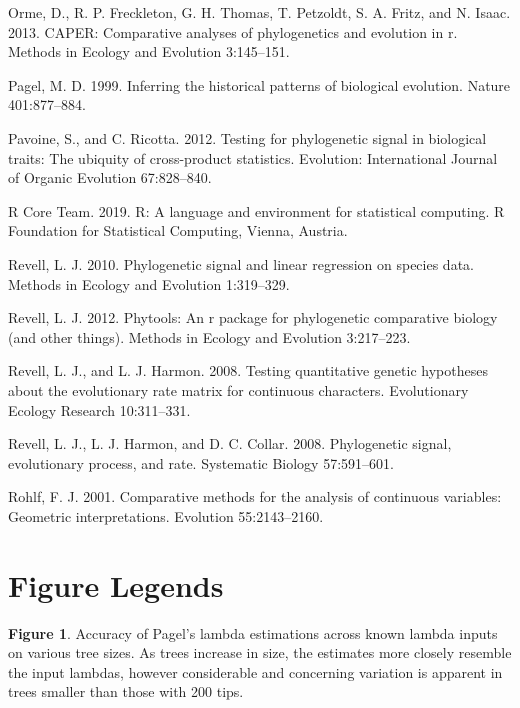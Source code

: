 \documentclass[
]{article}
\begin{document}
\leavevmode\hypertarget{ref-Orme2013}{}%
Orme, D., R. P. Freckleton, G. H. Thomas, T. Petzoldt, S. A. Fritz, and
N. Isaac. 2013. CAPER: Comparative analyses of phylogenetics and
evolution in r. Methods in Ecology and Evolution 3:145--151.

\leavevmode\hypertarget{ref-Pagel1999}{}%
Pagel, M. D. 1999. Inferring the historical patterns of biological
evolution. Nature 401:877--884.

\leavevmode\hypertarget{ref-Pavoine2012}{}%
Pavoine, S., and C. Ricotta. 2012. Testing for phylogenetic signal in
biological traits: The ubiquity of cross-product statistics. Evolution:
International Journal of Organic Evolution 67:828--840.

\leavevmode\hypertarget{ref-RCT}{}%
R Core Team. 2019. R: A language and environment for statistical
computing. R Foundation for Statistical Computing, Vienna, Austria.

\leavevmode\hypertarget{ref-Revell2010}{}%
Revell, L. J. 2010. Phylogenetic signal and linear regression on species
data. Methods in Ecology and Evolution 1:319--329.

\leavevmode\hypertarget{ref-Revell2012}{}%
Revell, L. J. 2012. Phytools: An r package for phylogenetic comparative
biology (and other things). Methods in Ecology and Evolution 3:217--223.

\leavevmode\hypertarget{ref-RevellHarmon2008}{}%
Revell, L. J., and L. J. Harmon. 2008. Testing quantitative genetic
hypotheses about the evolutionary rate matrix for continuous characters.
Evolutionary Ecology Research 10:311--331.

\leavevmode\hypertarget{ref-Revell_et_al2008}{}%
Revell, L. J., L. J. Harmon, and D. C. Collar. 2008. Phylogenetic
signal, evolutionary process, and rate. Systematic Biology 57:591--601.

\leavevmode\hypertarget{ref-Rohlf2001}{}%
Rohlf, F. J. 2001. Comparative methods for the analysis of continuous
variables: Geometric interpretations. Evolution 55:2143--2160.

\newpage

\hypertarget{figure-legends}{%
\section{Figure Legends}\label{figure-legends}}

\textbf{Figure 1}. Accuracy of Pagel's lambda estimations across known
lambda inputs on various tree sizes. As trees increase in size, the
estimates more closely resemble the input lambdas, however considerable
and concerning variation is apparent in trees smaller than those with
200 tips. \hfill\break
\end{document}
